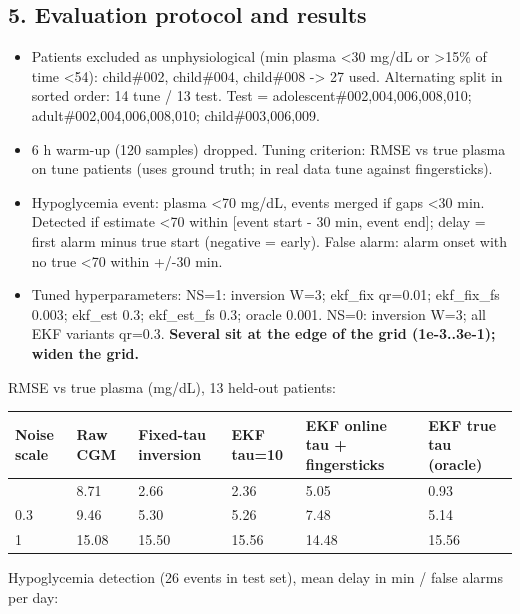 \documentclass[11pt,a4paper]{article}
\providecommand{\tightlist}{\setlength{\itemsep}{0pt}\setlength{\parskip}{0pt}}
\begin{document}
\hypertarget{5-evaluation-protocol-and-results}{%
\subsection{5. Evaluation protocol and
results}\label{5-evaluation-protocol-and-results}}

\begin{itemize}
\tightlist
\item
  Patients excluded as unphysiological (min plasma \textless30 mg/dL or
  \textgreater15\% of time \textless54): child\#002, child\#004,
  child\#008 -\textgreater{} 27 used. Alternating split in sorted order:
  14 tune / 13 test. Test = adolescent\#002,004,006,008,010;
  adult\#002,004,006,008,010; child\#003,006,009.
\item
  6 h warm-up (120 samples) dropped. Tuning criterion: RMSE vs true
  plasma on tune patients (uses ground truth; in real data tune against
  fingersticks).
\item
  Hypoglycemia event: plasma \textless70 mg/dL, events merged if gaps
  \textless30 min. Detected if estimate \textless70 within {[}event
  start - 30 min, event end{]}; delay = first alarm minus true start
  (negative = early). False alarm: alarm onset with no true \textless70
  within +/-30 min.
\item
  Tuned hyperparameters: NS=1: inversion W=3; ekf\_fix qr=0.01;
  ekf\_fix\_fs 0.003; ekf\_est 0.3; ekf\_est\_fs 0.3; oracle 0.001.
  NS=0: inversion W=3; all EKF variants qr=0.3. \textbf{Several sit at
  the edge of the grid (1e-3..3e-1); widen the grid.}
\end{itemize}

RMSE vs true plasma (mg/dL), 13 held-out patients:

\begin{longtable}[]{@{}llllll@{}}
\toprule\noalign{}
Noise scale & Raw CGM & Fixed-tau inversion & EKF tau=10 & EKF online
tau + fingersticks & EKF true tau (oracle) \\
\midrule\noalign{}
\endhead
\bottomrule\noalign{}
\endlastfoot
0 & 8.71 & 2.66 & 2.36 & 5.05 & 0.93 \\
0.3 & 9.46 & 5.30 & 5.26 & 7.48 & 5.14 \\
1 & 15.08 & 15.50 & 15.56 & 14.48 & 15.56 \\
\end{longtable}

Hypoglycemia detection (26 events in test set), mean delay in min /
false alarms per day:
\end{document}
